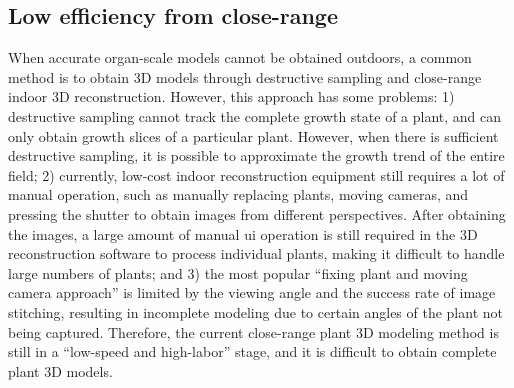 
\subsection{Low efficiency from close-range}
When accurate organ-scale models cannot be obtained outdoors, a common method is to obtain 3D models through destructive sampling and close-range indoor 3D reconstruction. However, this approach has some problems: 1) destructive sampling cannot track the complete growth state of a plant, and can only obtain growth slices of a particular plant. However, when there is sufficient destructive sampling, it is possible to approximate the growth trend of the entire field; 2) currently, low-cost indoor reconstruction equipment still requires a lot of manual operation, such as manually replacing plants, moving cameras, and pressing the shutter to obtain images from different perspectives. After obtaining the images, a large amount of manual \gls{ui} operation is still required in the 3D reconstruction software to process individual plants, making it difficult to handle large numbers of plants; and 3) the most popular ``fixing plant and moving camera approach'' is limited by the viewing angle and the success rate of image stitching, resulting in incomplete modeling due to certain angles of the plant not being captured. Therefore, the current close-range plant 3D modeling method is still in a ``low-speed and high-labor'' stage, and it is difficult to obtain complete plant 3D models.

